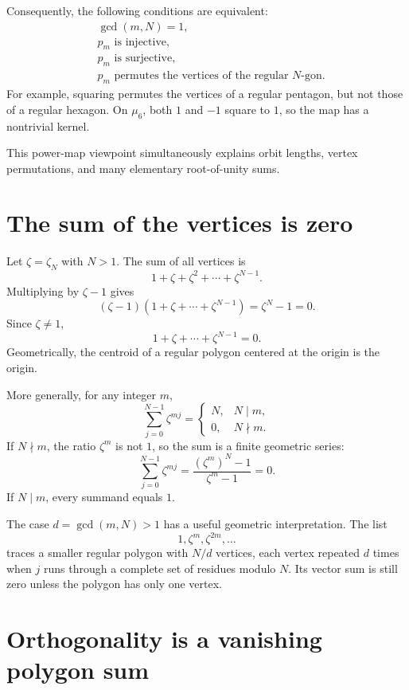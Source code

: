 Consequently, the following conditions are equivalent:
\[
\begin{aligned}
&\gcd(m,N)=1,\\
&p_m\text{ is injective},\\
&p_m\text{ is surjective},\\
&p_m\text{ permutes the vertices of the regular }N\text{-gon}.
\end{aligned}
\]
For example, squaring permutes the vertices of a regular pentagon, but not those of a regular hexagon.  On \(\mu_6\), both \(1\) and \(-1\) square to \(1\), so the map has a nontrivial kernel.

This power-map viewpoint simultaneously explains orbit lengths, vertex permutations, and many elementary root-of-unity sums.

\section{The sum of the vertices is zero}

Let \(\zeta=\zeta_N\) with \(N>1\).  The sum of all vertices is
\[
  1+\zeta+\zeta^2+\cdots+\zeta^{N-1}.
\]
Multiplying by \(\zeta-1\) gives
\[
  (\zeta-1)(1+\zeta+\cdots+\zeta^{N-1})
  =\zeta^N-1=0.
\]
Since \(\zeta\neq1\),
\[
  \boxed{1+\zeta+\cdots+\zeta^{N-1}=0.}
\]
Geometrically, the centroid of a regular polygon centered at the origin is the origin.

More generally, for any integer \(m\),
\[
  \sum_{j=0}^{N-1}\zeta^{mj}
  =
  \begin{cases}
  N,&N\mid m,\\
  0,&N\nmid m.
  \end{cases}
\]
If \(N\nmid m\), the ratio \(\zeta^m\) is not \(1\), so the sum is a finite geometric series:
\[
  \sum_{j=0}^{N-1}\zeta^{mj}
  =\frac{(\zeta^m)^N-1}{\zeta^m-1}=0.
\]
If \(N\mid m\), every summand equals \(1\).

The case \(d=\gcd(m,N)>1\) has a useful geometric interpretation.  The list
\[
  1,\zeta^m,\zeta^{2m},\ldots
\]
traces a smaller regular polygon with \(N/d\) vertices, each vertex repeated \(d\) times when \(j\) runs through a complete set of residues modulo \(N\).  Its vector sum is still zero unless the polygon has only one vertex.

\section{Orthogonality is a vanishing polygon sum}

